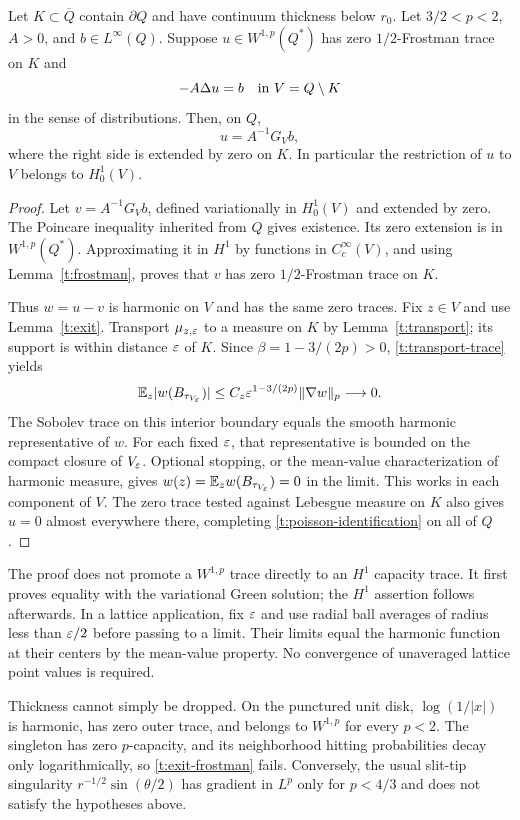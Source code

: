 \begin{theorem}\label{t:trace}
Let $K\subset\overline Q$ contain $\partial Q$ and have continuum
thickness below $r_0$.  Let $3/2<p<2$, $A>0$, and $b\in L^\infty(Q)$.
Suppose $u\in W^{1,p}(Q^*)$ has zero $1/2$-Frostman trace on $K$ and
\[
 -A\Delta u=b\quad\hbox{in }V=Q\setminus K
\]
in the sense of distributions.  Then, on $Q$,
\begin{equation}\label{t:poisson-identification}
 u=A^{-1}G_Vb,
\end{equation}
where the right side is extended by zero on $K$.  In particular the
restriction of $u$ to $V$ belongs to $H^1_0(V)$.
\end{theorem}
\begin{proof}
Let $v=A^{-1}G_Vb$, defined variationally in $H^1_0(V)$ and extended by
zero.  The Poincare inequality inherited from $Q$ gives existence.
Its zero extension is in $W^{1,p}(Q^*)$.  Approximating it in $H^1$ by
functions in $C_c^\infty(V)$, and using Lemma~\ref{t:frostman}, proves
that $v$ has zero $1/2$-Frostman trace on $K$.

Thus $w=u-v$ is harmonic on $V$ and has the same zero traces.  Fix $z\in V$
and use Lemma~\ref{t:exit}.  Transport $\mu_{z,\varepsilon}$ to a measure on
$K$ by Lemma~\ref{t:transport}; its support is within distance $\varepsilon$ of
$K$.  Since $\beta=1-3/(2p)>0$, \eqref{t:transport-trace} yields
\[
 \mathbb E_z|w(B_{\tau_{V_\varepsilon}})|
 \le C_z\varepsilon^{1-3/(2p)}\|\nabla w\|_p\longrightarrow0.
\]
The Sobolev trace on this interior boundary equals the smooth harmonic
representative of $w$.  For each fixed $\varepsilon$, that representative is
bounded on the compact closure of $V_\varepsilon$.  Optional stopping, or the
mean-value characterization of harmonic measure, gives
$w(z)=\mathbb E_z w(B_{\tau_{V_\varepsilon}})=0$ in the limit.  This works in each
component of $V$.  The zero trace tested against Lebesgue measure on $K$
also gives $u=0$ almost everywhere there, completing
\eqref{t:poisson-identification} on all of $Q$.
\end{proof}

\begin{remark}
The proof does not promote a $W^{1,p}$ trace directly to an $H^1$ capacity
trace.  It first proves equality with the variational Green solution; the
$H^1$ assertion follows afterwards.  In a lattice application, fix
$\varepsilon$ and use radial ball averages of radius less than $\varepsilon/2$ before
passing to a limit.  Their limits equal the harmonic function at their
centers by the mean-value property.  No convergence of unaveraged lattice
point values is required.

Thickness cannot simply be dropped.  On the punctured unit disk,
$\log(1/|x|)$ is harmonic, has zero outer trace, and belongs to
$W^{1,p}$ for every $p<2$.  The singleton has zero $p$-capacity, and its
neighborhood hitting probabilities decay only logarithmically, so
\eqref{t:exit-frostman} fails.  Conversely, the usual slit-tip singularity
$r^{-1/2}\sin(\theta/2)$ has gradient in $L^p$ only for $p<4/3$ and
does not satisfy the hypotheses above.
\end{remark}

